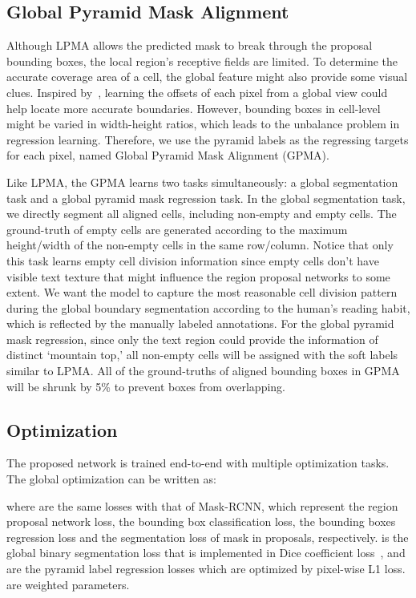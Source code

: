 \documentclass[runningheads]{llncs}
\begin{document}
\subsection{Global Pyramid Mask Alignment}
Although LPMA allows the predicted mask to break through the proposal bounding boxes, the local region's receptive fields are limited. To determine the accurate coverage area of a cell, the global feature might also provide some visual clues. Inspired by~\cite{zhou2017east,qiao2020text}, learning the offsets of each pixel from a global view could help locate more accurate boundaries. However, bounding boxes in cell-level might be varied in width-height ratios, which leads to the unbalance problem in regression learning. Therefore, we use the pyramid labels as the regressing targets for each pixel, named Global Pyramid Mask Alignment (GPMA).

Like LPMA, the GPMA learns two tasks simultaneously: a global segmentation task and a global pyramid mask regression task. In the global segmentation task, we directly segment all aligned cells, including non-empty and empty cells. The ground-truth of empty cells are generated according to the maximum height/width of the non-empty cells in the same row/column. Notice that only this task learns empty cell division information since empty cells don't have visible text texture that might influence the region proposal networks to some extent.
We want the model to capture the most reasonable cell division pattern during the global boundary segmentation according to the human's reading habit, which is reflected by the manually labeled annotations.
For the global pyramid mask regression, since only the text region could provide the information of distinct `mountain top,' all non-empty cells will be assigned with the soft labels similar to LPMA.
All of the ground-truths of aligned bounding boxes in GPMA will be shrunk by 5\% to prevent boxes from overlapping.

\subsection{Optimization}
The proposed network is trained end-to-end with multiple optimization tasks. The global optimization can be written as:

where  are the same losses with that of Mask-RCNN, which represent the region proposal network loss, the bounding box classification loss, the bounding boxes regression loss and the segmentation loss of mask in proposals, respectively.  is the global binary segmentation loss that is implemented in Dice coefficient loss~\cite{milletari2016v},  and  are the pyramid label regression losses which are optimized by pixel-wise L1 loss.  are weighted parameters.
\end{document}
